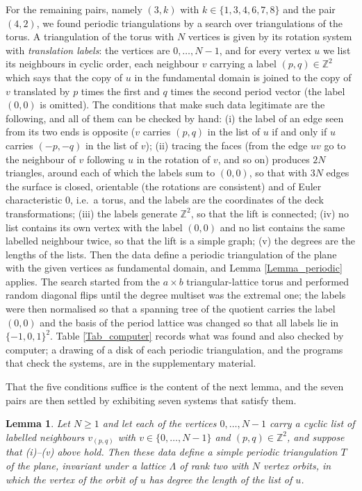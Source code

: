 \documentclass[10pt,a4paper]{article}
\newtheorem{lemma}[theorem]{Lemma}
\begin{document}
For the remaining pairs, namely $(3,k)$ with $k\in \{1,3,4,6,7,8\}$ and the pair $(4,2)$, we found periodic
triangulations by a search over triangulations of the torus. A
triangulation of the torus with $N$ vertices is given by its rotation system with \emph{translation labels}: the
vertices are $0,\ldots ,N-1$, and for every vertex $u$ we list its neighbours in cyclic order, each neighbour $v$
carrying a label $(p,q)\in \mathbb{Z}^{2}$ which says that the copy of $u$ in the fundamental domain is joined to the
copy of $v$ translated by $p$ times the first and $q$ times the second period vector (the label $(0,0)$ is omitted).
The conditions that make such data legitimate are the following, and all of them can be checked by
hand: (i) the label of an edge seen from its two ends is
opposite ($v$ carries $(p,q)$ in the list of $u$ if and only if $u$ carries $(-p,-q)$ in the list of $v$); (ii) tracing
the faces (from the edge $uv$ go to the neighbour of $v$ following $u$ in the rotation of $v$, and so on) produces $2N$
triangles, around each of which the labels sum to $(0,0)$, so that with $3N$ edges the surface is closed, orientable
(the rotations are consistent) and of Euler characteristic $0$, i.e.\ a torus, and the labels are the coordinates of
the deck transformations; (iii) the labels generate $\mathbb{Z}^{2}$, so that the lift is connected; (iv) no list
contains its own vertex with the label $(0,0)$ and no list contains the same labelled neighbour twice, so that the lift
is a simple graph; (v) the degrees are the lengths of the lists. Then the data define a periodic triangulation of the
plane with the given vertices as fundamental domain, and Lemma \ref{Lemma_periodic} applies. The search started
from the $a\times b$ triangular-lattice torus and performed random diagonal flips until the degree multiset was
the extremal one; the labels were then normalised so that a spanning tree of the quotient carries the label
$(0,0)$ and the basis of the period lattice was changed so that all labels lie in $\{-1,0,1\}^{2}$. Table
\ref{Tab_computer} records what was found and also checked by computer; a drawing of a disk of each
periodic triangulation, and the programs that check the systems, are in the supplementary material.

That the five conditions suffice is the content of the next lemma, and the seven pairs are then settled by
exhibiting seven systems that satisfy them.

\begin{lemma}
\label{Lemma_torus}Let $N\geq 1$ and let each of the vertices $0,\ldots ,N-1$ carry a cyclic list of labelled
neighbours $v_{(p,q)}$ with $v\in \{0,\ldots ,N-1\}$ and $(p,q)\in \mathbb{Z}^{2}$, and suppose that
\textup{(i)}--\textup{(v)} above hold. Then these data define a simple periodic triangulation $T$ of the
plane, invariant under a lattice $\Lambda $ of rank two with $N$ vertex orbits, in which the vertex of the
orbit of $u$ has degree the length of the list of $u$.
\end{lemma}
\end{document}
